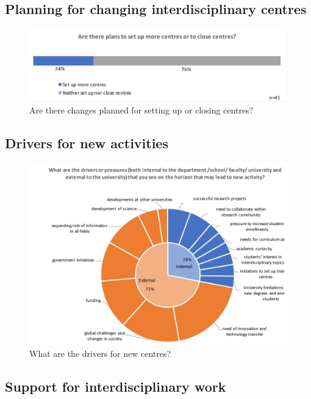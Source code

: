 \subsection{Planning for changing interdisciplinary centres}

\begin{figure}[h]
\centering
\includegraphics[width = \linewidth]{charts/5f.jpg}
\caption{Are there changes planned for setting up or closing centres?}
\label{sect5:changes}
\end{figure}

\subsection{Drivers for new activities}

\begin{figure}[h]
\centering
\includegraphics[width = \linewidth]{charts/5g.jpg}
\caption{What are the drivers for new centres?}
\label{sect3:drivers}
\end{figure}

\subsection{Support for interdisciplinary work}

